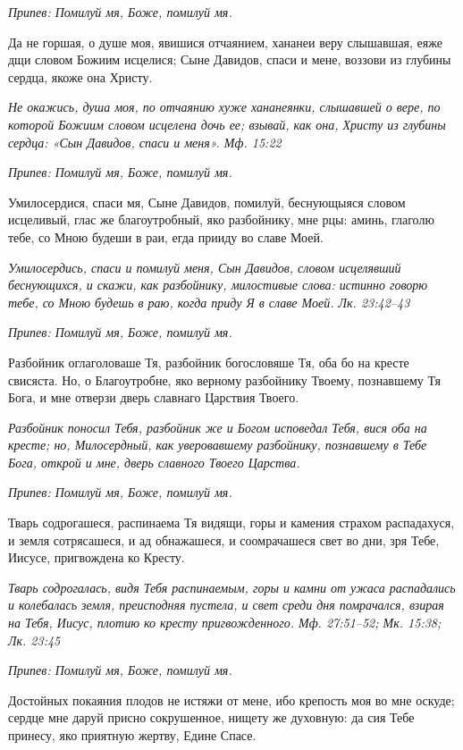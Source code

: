 \itshape Припев:\normalfont{} Помилуй мя, Боже, помилуй мя.


Да не горшая, о душе моя, явишися отчаянием, хананеи веру слышавшая, еяже дщи словом Божиим исцелися; Сыне Давидов, спаси и мене, воззови из глубины сердца, якоже она Христу.


\itshape Не окажись, душа моя, по отчаянию хуже хананеянки, слышавшей о вере, по которой Божиим словом исцелена дочь ее; взывай, как она, Христу из глубины сердца: «Сын Давидов, спаси и меня». Мф. 15:22\normalfont{}


\itshape Припев:\normalfont{} Помилуй мя, Боже, помилуй мя.


Умилосердися, спаси мя, Сыне Давидов, помилуй, беснующыяся словом исцеливый, глас же благоутробный, яко разбойнику, мне рцы: аминь, глаголю тебе, со Мною будеши в раи, егда прииду во славе Моей.


\itshape Умилосердись, спаси и помилуй меня, Сын Давидов, словом исцелявший беснующихся, и скажи, как разбойнику, милостивые слова: истинно говорю тебе, со Мною будешь в раю, когда приду Я в славе Моей. Лк. 23:42–43\normalfont{}


\itshape Припев:\normalfont{} Помилуй мя, Боже, помилуй мя.


Разбойник оглаголоваше Тя, разбойник богословяше Тя, оба бо на кресте свисяста. Но, о Благоутробне, яко верному разбойнику Твоему, познавшему Тя Бога, и мне отверзи дверь славнаго Царствия Твоего.


\itshape Разбойник поносил Тебя, разбойник же и Богом исповедал Тебя, вися оба на кресте; но, Милосердный, как уверовавшему разбойнику, познавшему в Тебе Бога, открой и мне, дверь славного Твоего Царства.\normalfont{}


\itshape Припев:\normalfont{} Помилуй мя, Боже, помилуй мя.


Тварь содрогашеся, распинаема Тя видящи, горы и камения страхом распадахуся, и земля сотрясашеся, и ад обнажашеся, и соомрачашеся свет во дни, зря Тебе, Иисусе, пригвождена ко Кресту.


\itshape Тварь содрогалась, видя Тебя распинаемым, горы и камни от ужаса распадались и колебалась земля, преисподняя пустела, и свет среди дня помрачался, взирая на Тебя, Иисус, плотию ко кресту пригвожденного. Мф. 27:51–52; Мк. 15:38; Лк. 23:45\normalfont{}


\itshape Припев:\normalfont{} Помилуй мя, Боже, помилуй мя.


Достойных покаяния плодов не истяжи от мене, ибо крепость моя во мне оскуде; сердце мне даруй присно сокрушенное, нищету же духовную: да сия Тебе принесу, яко приятную жертву, Едине Спасе.


